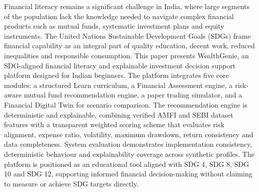 Financial literacy remains a significant challenge in India, where large segments of the population lack the knowledge needed to navigate complex financial products such as mutual funds, systematic investment plans and equity instruments. The United Nations Sustainable Development Goals (SDGs) frame financial capability as an integral part of quality education, decent work, reduced inequalities and responsible consumption. This paper presents WealthGenie, an SDG-aligned financial literacy and explainable investment decision support platform designed for Indian beginners. The platform integrates five core modules: a structured Learn curriculum, a Financial Assessment engine, a risk-aware mutual fund recommendation engine, a paper trading simulator, and a Financial Digital Twin for scenario comparison. The recommendation engine is deterministic and explainable, combining verified AMFI and SEBI dataset features with a transparent weighted scoring scheme that evaluates risk alignment, expense ratio, volatility, maximum drawdown, return consistency and data completeness. System evaluation demonstrates implementation consistency, deterministic behaviour and explainability coverage across synthetic profiles. The platform is positioned as an educational tool aligned with SDG 4, SDG 8, SDG 10 and SDG 12, supporting informed financial decision-making without claiming to measure or achieve SDG targets directly.